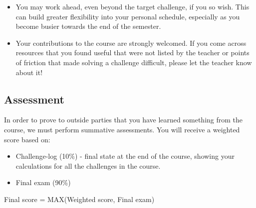 \begin{itemize}
    \item You may work ahead, even beyond the target challenge, if you so wish. This can build greater flexibility into your personal schedule, especially as you become busier towards the end of the semester.
    \item Your contributions to the course are strongly welcomed. If you come across resources that you found useful that were not listed by the teacher or points of friction that made solving a challenge difficult, please let the teacher know about it!
\end{itemize}

\subsection{Assessment}
In order to prove to outside parties that you have learned something from the course, we must perform summative assessments. You will receive a weighted score based on:

\begin{itemize}
    \item Challenge-log (10\%) - final state at the end of the course, showing your calculations for all the challenges in the course.
    \item Final exam (90\%)
\end{itemize}

Final score = MAX(Weighted score, Final exam)
